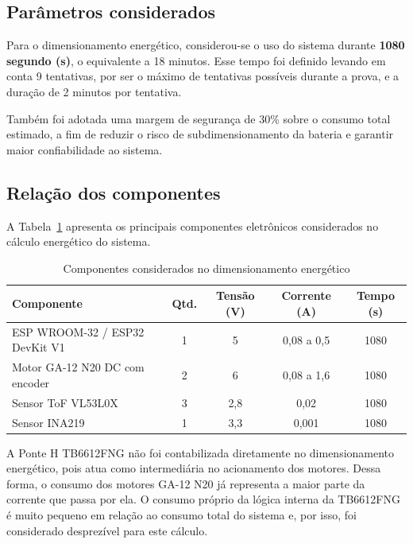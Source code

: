 \subsection{Parâmetros considerados}

Para o dimensionamento energético, considerou-se o uso do sistema durante \textbf{1080 segundo (s)}, o equivalente a 18 minutos. Esse tempo foi definido levando em conta 9 tentativas, por ser o máximo de tentativas possíveis durante a prova, e a duração de 2 minutos por tentativa.

Também foi adotada uma margem de segurança de 30\% sobre o consumo total estimado, a fim de reduzir o risco de subdimensionamento da bateria e garantir maior confiabilidade ao sistema.

\subsection{Relação dos componentes}

A Tabela~\ref{tab:componentes-energia} apresenta os principais componentes eletrônicos considerados no cálculo energético do sistema.

\begin{table}[htbp]
\centering
\caption{Componentes considerados no dimensionamento energético}
\label{tab:componentes-energia}
\small
\setlength{\tabcolsep}{4pt}
\renewcommand{\arraystretch}{1.2}
\begin{tabularx}{\textwidth}{|>{\raggedright\arraybackslash}X|c|c|c|c|}
\hline
\textbf{Componente} & \textbf{Qtd.} & \textbf{Tensão (V)} & \textbf{Corrente (A)} & \textbf{Tempo (s)} \\ \hline

ESP WROOM-32 / ESP32 DevKit V1 
& 1 & 5 & 0,08 a 0,5 & 1080 \\ \hline

Motor GA-12 N20 DC com encoder 
& 2 & 6 & 0,08 a 1,6 & 1080 \\ \hline

Sensor ToF VL53L0X 
& 3 & 2,8 & 0,02 & 1080 \\ \hline

Sensor INA219 
& 1 & 3,3 & 0,001 & 1080 \\ \hline

\end{tabularx}
\end{table}

A Ponte H TB6612FNG não foi contabilizada diretamente no dimensionamento energético, pois atua como intermediária no acionamento dos motores. Dessa forma, o consumo dos motores GA-12 N20 já representa a maior parte da corrente que passa por ela. O consumo próprio da lógica interna da TB6612FNG é muito pequeno em relação ao consumo total do sistema e, por isso, foi considerado desprezível para este cálculo.

